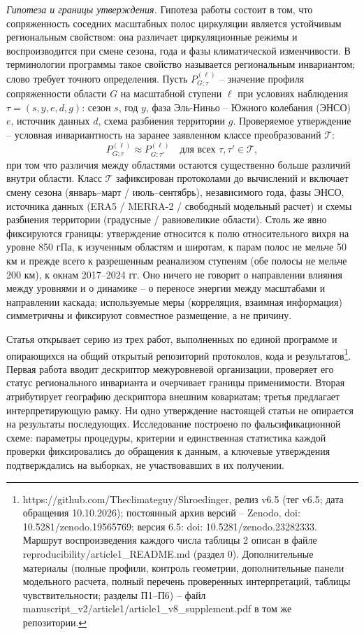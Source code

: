 \documentclass[12pt,a4paper]{article}
\begin{document}
\emph{Гипотеза и границы утверждения.} Гипотеза работы состоит в том, что сопряженность соседних масштабных полос циркуляции является устойчивым региональным свойством: она различает циркуляционные режимы и воспроизводится при смене сезона, года и фазы климатической изменчивости. В терминологии программы \cite{Puzachenko2010} такое свойство называется региональным инвариантом; слово требует точного определения. Пусть $P^{(\ell)}_{G;\tau}$ -- значение профиля сопряженности области $G$ на масштабной ступени $\ell$ при условиях наблюдения $\tau = (s, y, e, d, g)$: сезон $s$, год $y$, фаза Эль-Ниньо -- Южного колебания (ЭНСО) $e$, источник данных $d$, схема разбиения территории $g$. Проверяемое утверждение -- условная инвариантность на заранее заявленном классе преобразований $\mathcal{T}$:
\begin{equation}
\label{eq:inv}
P^{(\ell)}_{G;\tau} \approx P^{(\ell)}_{G;\tau'} \quad \text{для всех } \tau, \tau' \in \mathcal{T},
\end{equation}
при том что различия между областями остаются существенно больше различий внутри области. Класс $\mathcal{T}$ зафиксирован протоколами до вычислений и включает смену сезона (январь--март / июль--сентябрь), независимого года, фазы ЭНСО, источника данных (ERA5 / MERRA-2 / свободный модельный расчет) и схемы разбиения территории (градусные / равновеликие области). Столь же явно фиксируются границы: утверждение относится к полю относительного вихря на уровне 850 гПа, к изученным областям и широтам, к парам полос не мельче 50 км и прежде всего к разрешенным реанализом ступеням (обе полосы не мельче 200 км), к окнам 2017--2024 гг. Оно ничего не говорит о направлении влияния между уровнями и о динамике -- о переносе энергии между масштабами и направлении каскада; используемые меры (корреляция, взаимная информация) симметричны и фиксируют совместное размещение, а не причину.

Статья открывает серию из трех работ, выполненных по единой программе и опирающихся на общий открытый репозиторий протоколов, кода и результатов\footnote{https://github.com/Theclimateguy/Shroedinger, релиз v6.5 (тег v6.5; дата обращения 10.10.2026); постоянный архив версий -- Zenodo, doi: 10.5281/zenodo.19565769; версия 6.5: doi: 10.5281/zenodo.23282333. Маршрут воспроизведения каждого числа таблицы 2 описан в файле reproducibility/article1\_README.md (раздел 0). Дополнительные материалы (полные профили, контроль геометрии, дополнительные панели модельного расчета, полный перечень проверенных интерпретаций, таблицы чувствительности; разделы П1--П6) -- файл manuscript\_v2/article1/article1\_v8\_supplement.pdf в том же репозитории.}. Первая работа вводит дескриптор межуровневой организации, проверяет его статус регионального инварианта и очерчивает границы применимости. Вторая атрибутирует географию дескриптора внешним ковариатам; третья предлагает интерпретирующую рамку. Ни одно утверждение настоящей статьи не опирается на результаты последующих. Исследование построено по фальсификационной схеме: параметры процедуры, критерии и единственная статистика каждой проверки фиксировались до обращения к данным, а ключевые утверждения подтверждались на выборках, не участвовавших в их получении.
\end{document}
